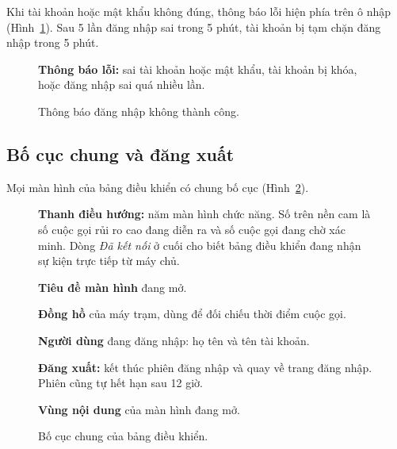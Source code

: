 \documentclass[11pt]{article}
\begin{document}
Khi tài khoản hoặc mật khẩu không đúng, thông báo lỗi hiện phía trên ô nhập (Hình~\ref{fig:loginerr}). Sau 5 lần đăng nhập sai trong 5 phút, tài khoản bị tạm chặn đăng nhập trong 5 phút.

\begin{figure}[tbp]
  \centering
  \caption{Thông báo đăng nhập không thành công.}
  \label{fig:loginerr}
  \begin{flushleft}\small
\begin{legend}
  \item \textbf{Thông báo lỗi:} sai tài khoản hoặc mật khẩu, tài khoản bị khóa, hoặc đăng nhập sai quá nhiều lần.
\end{legend}
  \end{flushleft}
\end{figure}

\subsection{Bố cục chung và đăng xuất}

Mọi màn hình của bảng điều khiển có chung bố cục (Hình~\ref{fig:layout}).

\begin{figure}[tbp]
  \centering
  \caption{Bố cục chung của bảng điều khiển.}
  \label{fig:layout}
  \begin{flushleft}\small
\begin{legend}
  \item \textbf{Thanh điều hướng:} năm màn hình chức năng. Số trên nền cam là số cuộc gọi rủi ro cao đang diễn ra và số cuộc gọi đang chờ xác minh. Dòng \emph{Đã kết nối} ở cuối cho biết bảng điều khiển đang nhận sự kiện trực tiếp từ máy chủ.
  \item \textbf{Tiêu đề màn hình} đang mở.
  \item \textbf{Đồng hồ} của máy trạm, dùng để đối chiếu thời điểm cuộc gọi.
  \item \textbf{Người dùng} đang đăng nhập: họ tên và tên tài khoản.
  \item \textbf{Đăng xuất:} kết thúc phiên đăng nhập và quay về trang đăng nhập. Phiên cũng tự hết hạn sau 12 giờ.
  \item \textbf{Vùng nội dung} của màn hình đang mở.
\end{legend}
  \end{flushleft}
\end{figure}

\end{document}
